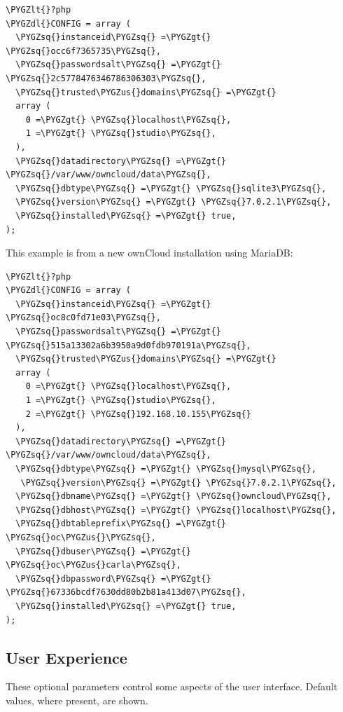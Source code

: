 \documentclass[letterpaper,10pt,english]{sphinxmanual}
\def\PYGZus{\char`\_}
\def\PYGZlt{\char`\<}
\def\PYGZgt{\char`\>}
\def\PYGZdl{\char`\$}
\def\PYGZsq{\char`\'}
\begin{document}
\begin{Verbatim}[commandchars=\\\{\}]
\PYGZlt{}?php
\PYGZdl{}CONFIG = array (
  \PYGZsq{}instanceid\PYGZsq{} =\PYGZgt{} \PYGZsq{}occ6f7365735\PYGZsq{},
  \PYGZsq{}passwordsalt\PYGZsq{} =\PYGZgt{} \PYGZsq{}2c5778476346786306303\PYGZsq{},
  \PYGZsq{}trusted\PYGZus{}domains\PYGZsq{} =\PYGZgt{}
  array (
    0 =\PYGZgt{} \PYGZsq{}localhost\PYGZsq{},
    1 =\PYGZgt{} \PYGZsq{}studio\PYGZsq{},
  ),
  \PYGZsq{}datadirectory\PYGZsq{} =\PYGZgt{} \PYGZsq{}/var/www/owncloud/data\PYGZsq{},
  \PYGZsq{}dbtype\PYGZsq{} =\PYGZgt{} \PYGZsq{}sqlite3\PYGZsq{},
  \PYGZsq{}version\PYGZsq{} =\PYGZgt{} \PYGZsq{}7.0.2.1\PYGZsq{},
  \PYGZsq{}installed\PYGZsq{} =\PYGZgt{} true,
);
\end{Verbatim}

This example is from a new ownCloud installation using MariaDB:

\begin{Verbatim}[commandchars=\\\{\}]
\PYGZlt{}?php
\PYGZdl{}CONFIG = array (
  \PYGZsq{}instanceid\PYGZsq{} =\PYGZgt{} \PYGZsq{}oc8c0fd71e03\PYGZsq{},
  \PYGZsq{}passwordsalt\PYGZsq{} =\PYGZgt{} \PYGZsq{}515a13302a6b3950a9d0fdb970191a\PYGZsq{},
  \PYGZsq{}trusted\PYGZus{}domains\PYGZsq{} =\PYGZgt{}
  array (
    0 =\PYGZgt{} \PYGZsq{}localhost\PYGZsq{},
    1 =\PYGZgt{} \PYGZsq{}studio\PYGZsq{},
    2 =\PYGZgt{} \PYGZsq{}192.168.10.155\PYGZsq{}
  ),
  \PYGZsq{}datadirectory\PYGZsq{} =\PYGZgt{} \PYGZsq{}/var/www/owncloud/data\PYGZsq{},
  \PYGZsq{}dbtype\PYGZsq{} =\PYGZgt{} \PYGZsq{}mysql\PYGZsq{},
   \PYGZsq{}version\PYGZsq{} =\PYGZgt{} \PYGZsq{}7.0.2.1\PYGZsq{},
  \PYGZsq{}dbname\PYGZsq{} =\PYGZgt{} \PYGZsq{}owncloud\PYGZsq{},
  \PYGZsq{}dbhost\PYGZsq{} =\PYGZgt{} \PYGZsq{}localhost\PYGZsq{},
  \PYGZsq{}dbtableprefix\PYGZsq{} =\PYGZgt{} \PYGZsq{}oc\PYGZus{}\PYGZsq{},
  \PYGZsq{}dbuser\PYGZsq{} =\PYGZgt{} \PYGZsq{}oc\PYGZus{}carla\PYGZsq{},
  \PYGZsq{}dbpassword\PYGZsq{} =\PYGZgt{} \PYGZsq{}67336bcdf7630dd80b2b81a413d07\PYGZsq{},
  \PYGZsq{}installed\PYGZsq{} =\PYGZgt{} true,
);
\end{Verbatim}


\subsection{User Experience}
\label{configuration_server/config_sample_php_parameters:user-experience}
These optional parameters control some aspects of the user interface. Default
values, where present, are shown.
\end{document}
